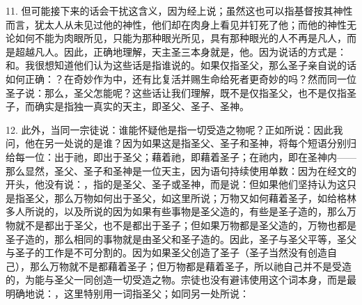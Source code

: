 11. 但可能接下来的话会干扰这含义，因为经上说；虽然这也可以指基督按其神性而言，犹太人从未见过他的神性，他们却在肉身上看见并钉死了他；而他的神性无论如何不能为肉眼所见，只能为那种眼光所见，具有那种眼光的人不再是凡人，而是超越凡人。因此，正确地理解，天主圣三本身就是，他。因为说话的方式是：和。我很想知道他们认为这些话是指谁说的。如果仅指圣父，那么圣子亲自说的话如何正确：？在奇妙作为中，还有比复活并赐生命给死者更奇妙的吗？然而同一位圣子说：那么，圣父怎能呢？这些话让我们理解，既不是仅指圣父，也不是仅指圣子，而确实是指独一真实的天主，即圣父、圣子、圣神。\par

12. 此外，当同一宗徒说：谁能怀疑他是指一切受造之物呢？正如所说：因此我问，他在另一处说的是谁？因为如果这是指圣父、圣子和圣神，将每个短语分别归给每一位：出于祂，即出于圣父；藉着祂，即藉着圣子；在祂内，即在圣神内——那么显然，圣父、圣子和圣神是一位天主，因为语句持续使用单数：因为在经文的开头，他没有说：，指的是圣父、圣子或圣神，而是说：但如果他们坚持认为这只是指圣父，那么万物如何出于圣父，如这里所说；万物又如何藉着圣子，如给格林多人所说的，以及所说的因为如果有些事物是圣父造的，有些是圣子造的，那么万物就不是都出于圣父，也不是都出于圣子；但如果万物都是圣父造的，万物也都是圣子造的，那么相同的事物就是由圣父和圣子造的。因此，圣子与圣父平等，圣父与圣子的工作是不可分割的。因为如果圣父创造了圣子（圣子当然没有创造自己），那么万物就不是都藉着圣子；但万物都是藉着圣子，所以祂自己并不是受造的，为能与圣父一同创造一切受造之物。宗徒也没有避讳使用这个词本身，而是最明确地说：，这里特别用一词指圣父；如同另一处所说：\par

